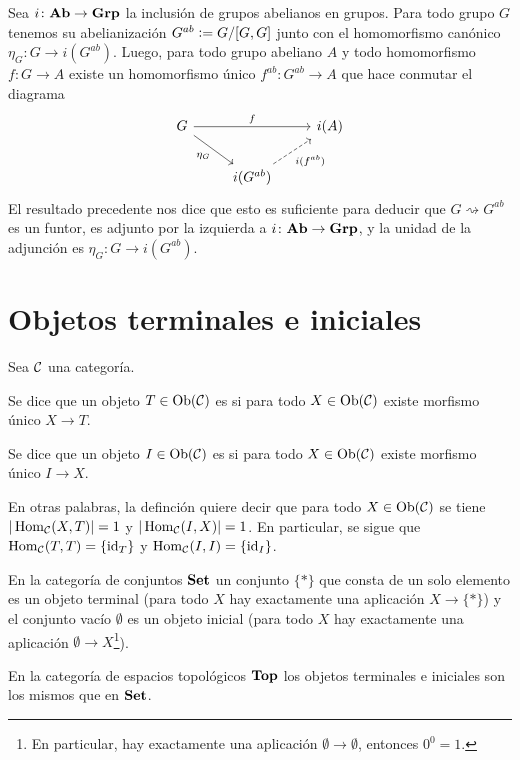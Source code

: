 \documentclass{article}
\numberwithin{equation}{section}
\theoremstyle{definition}
\begin{document}
\begin{ejemplo}
  Sea $i\colon \text{\bf Ab} \to \text{\bf Grp}$ la inclusión de grupos abelianos en
  grupos. Para todo grupo $G$ tenemos su abelianización $G^{ab} \mathrel{\mathop:}= G/[G,G]$
  junto con el homomorfismo canónico $\eta_G\colon G\to i (G^{ab})$. Luego, para
  todo grupo abeliano $A$ y todo homomorfismo $f\colon G \to A$ existe un
  homomorfismo único $f^{ab}\colon G^{ab} \to A$ que hace conmutar el diagrama
  \[ \begin{tikzcd}
    G \ar{rr}{f}\ar{dr}[swap]{\eta_G} && i (A) \\
    & i (G^{ab})\ar[dashed]{ur}[swap]{i (f^{ab})}
  \end{tikzcd} \]
  El resultado precedente nos dice que esto es suficiente para deducir que
  $G \rightsquigarrow G^{ab}$ es un funtor, es adjunto por la izquierda a
  $i\colon \text{\bf Ab} \to \text{\bf Grp}$, y la unidad de la adjunción es
  $\eta_G\colon G\to i (G^{ab})$.
\end{ejemplo}


\section{Objetos terminales e iniciales}

\begin{definicion}
  Sea $\mathcal{C}$ una categoría.

  Se dice que un objeto $T\in \operatorname{Ob} (\mathcal{C})$ es  si para todo
  $X \in \operatorname{Ob} (\mathcal{C})$ existe morfismo único $X\to T$.

  Se dice que un objeto $I\in \operatorname{Ob} (\mathcal{C})$ es  si para todo
  $X \in \operatorname{Ob} (\mathcal{C})$ existe morfismo único $I\to X$.
\end{definicion}

En otras palabras, la definción quiere decir que para todo
$X \in \operatorname{Ob} (\mathcal{C})$ se tiene $|\operatorname{Hom}_\mathcal{C} (X, T)| = 1$ y
$|\operatorname{Hom}_\mathcal{C} (I, X)| = 1$. En particular, se sigue que
$\operatorname{Hom}_\mathcal{C} (T,T) = \{ \mathrm{id}_{T} \}$ y $\operatorname{Hom}_\mathcal{C} (I,I) = \{ \mathrm{id}_{I} \}$.

\begin{ejemplo}
  En la categoría de conjuntos $\text{\bf Set}$ un conjunto $\{ \ast \}$ que consta
  de un solo elemento es un objeto terminal (para todo $X$ hay exactamente una
  aplicación $X\to \{ \ast \}$) y el conjunto vacío $\emptyset$ es un objeto
  inicial (para todo $X$ hay exactamente una aplicación
  $\emptyset \to X$\footnote{En particular, hay exactamente una aplicación
    $\emptyset\to\emptyset$, entonces $0^0 = 1$.}).

  En la categoría de espacios topológicos $\text{\bf Top}$ los objetos terminales e
  iniciales son los mismos que en $\text{\bf Set}$.
\end{ejemplo}
\end{document}
